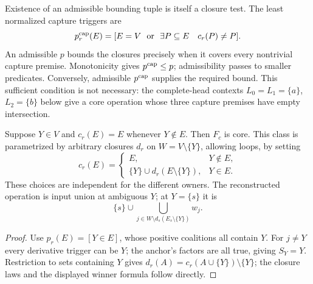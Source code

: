 Existence of an admissible bounding tuple is itself a closure test.
The least normalized capture triggers are
\[
 p_r^{\rm cap}(E)=
 [E=V\ \text{ or }\ \exists P\subseteq E\quad c_r(P)\ne P].
\]
An admissible $p$ bounds the closures precisely when it covers every
nontrivial capture premise. Monotonicity gives $p^{\rm cap}\leq p$;
admissibility passes to smaller predicates. Conversely, admissible
$p^{\rm cap}$ supplies the required bound. This sufficient condition
is not necessary: the complete-head contexts
$L_0=L_1=\{a\}$, $L_2=\{b\}$ below give a core operation whose three
capture premises have empty intersection.

\begin{corollary}
\label{core:cor:shared-anchor-closures}
Suppose $Y\in V$ and $c_r(E)=E$ whenever $Y\notin E$.
Then $F_c$ is core. This class is parametrized by arbitrary closures
$d_r$ on $W=V\setminus\{Y\}$, allowing loops, by setting
\[
 c_r(E)=\begin{cases}
 E,&Y\notin E,\\
 \{Y\}\cup d_r(E\setminus\{Y\}),&Y\in E.
 \end{cases}
\]
These choices are independent for the different owners. The reconstructed
operation is input union at ambiguous $Y$; at $Y=\{s\}$ it is
\[
 \{s\}\cup\bigcup_{j\in W\setminus d_s(E_s\setminus\{Y\})}w_j.
\]
\end{corollary}
\begin{proof}
Use $p_r(E)=[Y\in E]$, whose positive coalitions all contain $Y$.
For $j\ne Y$ every derivative trigger can be $Y$; the anchor's factors
are all true, giving $S_Y=Y$. Restriction to sets containing
$Y$ gives $d_r(A)=c_r(A\cup\{Y\})\setminus\{Y\}$; the closure laws
and the displayed winner formula follow directly.
\end{proof}
